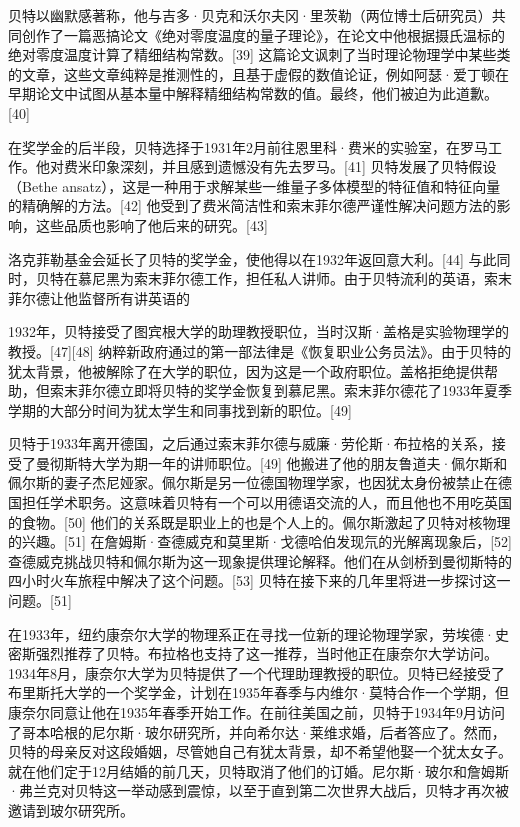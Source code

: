 贝特以幽默感著称，他与吉多·贝克和沃尔夫冈·里茨勒（两位博士后研究员）共同创作了一篇恶搞论文《绝对零度温度的量子理论》，在论文中他根据摄氏温标的绝对零度温度计算了精细结构常数。[39] 这篇论文讽刺了当时理论物理学中某些类的文章，这些文章纯粹是推测性的，且基于虚假的数值论证，例如阿瑟·爱丁顿在早期论文中试图从基本量中解释精细结构常数的值。最终，他们被迫为此道歉。[40]

在奖学金的后半段，贝特选择于1931年2月前往恩里科·费米的实验室，在罗马工作。他对费米印象深刻，并且感到遗憾没有先去罗马。[41] 贝特发展了贝特假设（Bethe ansatz），这是一种用于求解某些一维量子多体模型的特征值和特征向量的精确解的方法。[42] 他受到了费米简洁性和索末菲尔德严谨性解决问题方法的影响，这些品质也影响了他后来的研究。[43]

洛克菲勒基金会延长了贝特的奖学金，使他得以在1932年返回意大利。[44] 与此同时，贝特在慕尼黑为索末菲尔德工作，担任私人讲师。由于贝特流利的英语，索末菲尔德让他监督所有讲英语的

1932年，贝特接受了图宾根大学的助理教授职位，当时汉斯·盖格是实验物理学的教授。[47][48] 纳粹新政府通过的第一部法律是《恢复职业公务员法》。由于贝特的犹太背景，他被解除了在大学的职位，因为这是一个政府职位。盖格拒绝提供帮助，但索末菲尔德立即将贝特的奖学金恢复到慕尼黑。索末菲尔德花了1933年夏季学期的大部分时间为犹太学生和同事找到新的职位。[49]

贝特于1933年离开德国，之后通过索末菲尔德与威廉·劳伦斯·布拉格的关系，接受了曼彻斯特大学为期一年的讲师职位。[49] 他搬进了他的朋友鲁道夫·佩尔斯和佩尔斯的妻子杰尼娅家。佩尔斯是另一位德国物理学家，也因犹太身份被禁止在德国担任学术职务。这意味着贝特有一个可以用德语交流的人，而且他也不用吃英国的食物。[50] 他们的关系既是职业上的也是个人上的。佩尔斯激起了贝特对核物理的兴趣。[51] 在詹姆斯·查德威克和莫里斯·戈德哈伯发现氘的光解离现象后，[52] 查德威克挑战贝特和佩尔斯为这一现象提供理论解释。他们在从剑桥到曼彻斯特的四小时火车旅程中解决了这个问题。[53] 贝特在接下来的几年里将进一步探讨这一问题。[51]

在1933年，纽约康奈尔大学的物理系正在寻找一位新的理论物理学家，劳埃德·史密斯强烈推荐了贝特。布拉格也支持了这一推荐，当时他正在康奈尔大学访问。1934年8月，康奈尔大学为贝特提供了一个代理助理教授的职位。贝特已经接受了布里斯托大学的一个奖学金，计划在1935年春季与内维尔·莫特合作一个学期，但康奈尔同意让他在1935年春季开始工作。在前往美国之前，贝特于1934年9月访问了哥本哈根的尼尔斯·玻尔研究所，并向希尔达·莱维求婚，后者答应了。然而，贝特的母亲反对这段婚姻，尽管她自己有犹太背景，却不希望他娶一个犹太女子。就在他们定于12月结婚的前几天，贝特取消了他们的订婚。尼尔斯·玻尔和詹姆斯·弗兰克对贝特这一举动感到震惊，以至于直到第二次世界大战后，贝特才再次被邀请到玻尔研究所。
